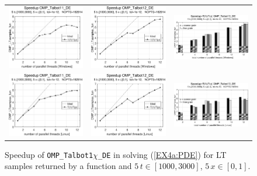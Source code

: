 \documentclass[a4paper,10pt]{report}%
\begin{document}
\begin{figure}[htb]
\centering
\begin{tabular}{ccc}%
\includegraphics[height=0.2\textwidth]{./FIGS/EX4a/EX4a_fun_speedup_11_5t_1000_Windows.eps} &
\includegraphics[height=0.2\textwidth]{./FIGS/EX4a/EX4a_fun_speedup_12_5t_1000_Windows.eps} &
\includegraphics[height=0.2\textwidth,keepaspectratio=true]{./FIGS/EX4a/EX4a_fun_speedup_13_5t_1000_Windows.eps} \\
\includegraphics[height=0.2\textwidth]{./FIGS/EX4a/EX4a_fun_speedup_11_5t_1000_Linux.eps} &
\includegraphics[height=0.2\textwidth]{./FIGS/EX4a/EX4a_fun_speedup_12_5t_1000_Linux.eps} &
\includegraphics[height=0.2\textwidth,keepaspectratio=true]{./FIGS/EX4a/EX4a_fun_speedup_13_5t_1000_Linux.eps}
\end{tabular}
\caption{\small Speedup of {\tt OMP\_Talbot1$\chi$\_DE} in solving (\ref{EX4a:PDE}) for LT samples
returned by a function and $5\,t\in[1000,3000]$, $5\,x\in[0,1]$.}
\label{PAR_EX4a_speedup_fun4}
\end{figure}
\end{document}

